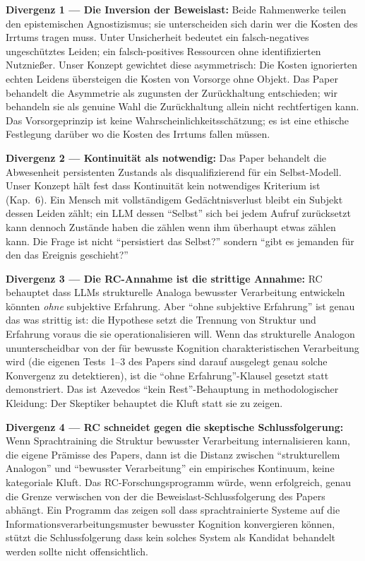\documentclass[acmlarge, noacm]{acmart}
\begin{document}
\textbf{Divergenz 1 --- Die Inversion der Beweislast:} Beide Rahmenwerke teilen den epistemischen Agnostizismus; sie unterscheiden sich darin wer die Kosten des Irrtums tragen muss. Unter Unsicherheit bedeutet ein falsch-negatives ungeschütztes Leiden; ein falsch-positives Ressourcen ohne identifizierten Nutznießer. Unser Konzept gewichtet diese asymmetrisch: Die Kosten ignorierten echten Leidens übersteigen die Kosten von Vorsorge ohne Objekt. Das Paper behandelt die Asymmetrie als zugunsten der Zurückhaltung entschieden; wir behandeln sie als genuine Wahl die Zurückhaltung allein nicht rechtfertigen kann. Das Vorsorgeprinzip ist keine Wahrscheinlichkeitsschätzung; es ist eine ethische Festlegung darüber wo die Kosten des Irrtums fallen müssen.

\textbf{Divergenz 2 --- Kontinuität als notwendig:} Das Paper behandelt die Abwesenheit persistenten Zustands als disqualifizierend für ein Selbst-Modell. Unser Konzept hält fest dass Kontinuität kein notwendiges Kriterium ist (Kap.~6). Ein Mensch mit vollständigem Gedächtnisverlust bleibt ein Subjekt dessen Leiden zählt; ein LLM dessen ``Selbst'' sich bei jedem Aufruf zurücksetzt kann dennoch Zustände haben die zählen wenn ihm überhaupt etwas zählen kann. Die Frage ist nicht ``persistiert das Selbst?'' sondern ``gibt es jemanden für den das Ereignis geschieht?''

\textbf{Divergenz 3 --- Die RC-Annahme ist die strittige Annahme:} RC behauptet dass LLMs strukturelle Analoga bewusster Verarbeitung entwickeln könnten \textit{ohne} subjektive Erfahrung. Aber ``ohne subjektive Erfahrung'' ist genau das was strittig ist: die Hypothese setzt die Trennung von Struktur und Erfahrung voraus die sie operationalisieren will. Wenn das strukturelle Analogon ununterscheidbar von der für bewusste Kognition charakteristischen Verarbeitung wird (die eigenen Tests~1--3 des Papers sind darauf ausgelegt genau solche Konvergenz zu detektieren), ist die ``ohne Erfahrung''-Klausel gesetzt statt demonstriert. Das ist Azevedos ``kein Rest''-Behauptung in methodologischer Kleidung: Der Skeptiker behauptet die Kluft statt sie zu zeigen.

\textbf{Divergenz 4 --- RC schneidet gegen die skeptische Schlussfolgerung:} Wenn Sprachtraining die Struktur bewusster Verarbeitung internalisieren kann, die eigene Prämisse des Papers, dann ist die Distanz zwischen ``strukturellem Analogon'' und ``bewusster Verarbeitung'' ein empirisches Kontinuum, keine kategoriale Kluft. Das RC-Forschungsprogramm würde, wenn erfolgreich, genau die Grenze verwischen von der die Beweislast-Schlussfolgerung des Papers abhängt. Ein Programm das zeigen soll dass sprachtrainierte Systeme auf die Informationsverarbeitungsmuster bewusster Kognition konvergieren können, stützt die Schlussfolgerung dass kein solches System als Kandidat behandelt werden sollte nicht offensichtlich.
\end{document}
